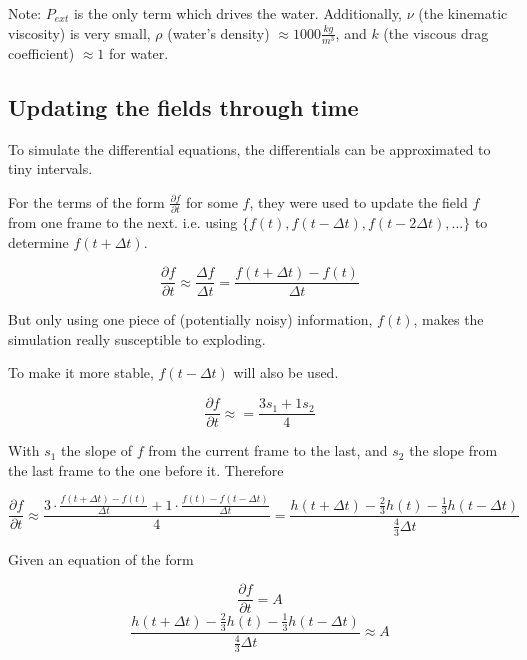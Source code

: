 \documentclass{article}
\begin{document}
Note: $P_{ext}$ is the only term which drives the water.
Additionally, $\nu$ (the kinematic viscosity) is very small, $\rho$ (water's density) $\approx 1000 \frac{kg}{m^3}$, and $k$ (the viscous drag coefficient) $\approx 1$ for water.

\subsection{Updating the fields through time}

To simulate the differential equations, the differentials can be approximated to tiny intervals.

For the terms of the form $\frac{\partial f}{\partial t}$ for some $f$, they were used to update the field $f$ from one frame to the next. i.e. using $ \{ f(t), f(t-\Delta t), f(t-2\Delta t), ... \} $ to determine $f(t+\Delta t)$.

\begin{equation}
    \frac{\partial f}{\partial t} \approx \frac{\Delta f}{\Delta t} = \frac{f(t+\Delta t) - f(t)}{\Delta t}
\end{equation}

But only using one piece of (potentially noisy) information, $f(t)$, makes the simulation really susceptible to exploding.

To make it more stable, $f(t - \Delta t)$ will also be used.

\begin{equation}
    \frac{\partial f}{\partial t} \approx = \frac{3 s_1 + 1 s_2}{4}
\end{equation}

With $s_1$ the slope of $f$ from the current frame to the last, and $s_2$ the slope from the last frame to the one before it. Therefore

\begin{equation}
    \frac{\partial f}{\partial t}
    \approx
    \frac{
        3 \cdot \frac{f(t + \Delta t) - f(t)}{\Delta t} +
        1 \cdot \frac{f(t) - f(t - \Delta t)}{\Delta t}
    }{4}
    =
    \frac{h(t + \Delta t) - \frac{2}{3}h(t) - \frac{1}{3} h(t - \Delta t)}{\frac{4}{3} \Delta t}
\end{equation}

Given an equation of the form

\begin{equation}
    \frac{\partial f}{\partial t} = A
\end{equation}
\begin{equation}
    \frac{h(t + \Delta t) - \frac{2}{3}h(t) - \frac{1}{3} h(t - \Delta t)}{\frac{4}{3} \Delta t} \approx A
\end{equation}
\end{document}
